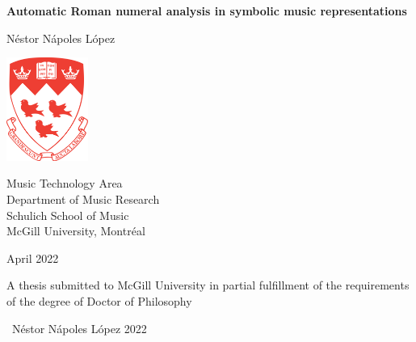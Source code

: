 \begin{titlepage}
\begin{center}
  
    \huge
    \textbf{Automatic Roman numeral analysis in symbolic music representations}

    
    \vspace{1cm}

    \LARGE
    N\'estor N\'apoles L\'opez
    
    \vspace{1cm}
    
    \includegraphics[width=0.2\textwidth]{figures/mcgill}

    \vspace{0.5cm}
    
    \large
    Music Technology Area \\
    Department of Music Research \\ 
    Schulich School of Music \\
    McGill University, Montr\'eal \\
    
    \vfill
    
    April 2022
    
    \vspace{2cm}
    
    A thesis submitted to McGill University in partial fulfillment of the requirements of the degree of Doctor of Philosophy
    
    \vspace{1cm}
    
    \textcopyright \ N\'estor N\'apoles L\'opez 2022 
    
\end{center}
\end{titlepage}